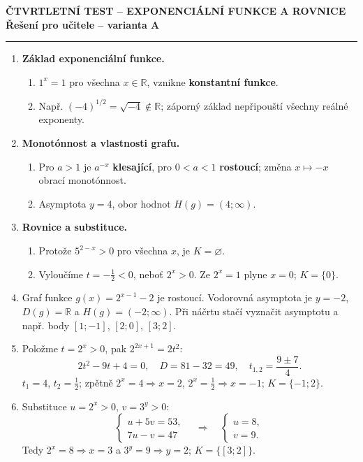 \documentclass[a4paper,11pt]{article}
\newcommand{\Title}[1]{%
\begin{center}{\large\bfseries ČTVRTLETNÍ TEST -- EXPONENCIÁLNÍ FUNKCE A ROVNICE}\\[1mm]
{\bfseries Řešení pro učitele -- varianta #1}\end{center}\hrule\vspace{3mm}}
\begin{document}
\Title{A}
\begin{enumerate}
\item \textbf{Základ exponenciální funkce.}
\begin{enumerate}[label=\alph*),leftmargin=6mm,itemsep=0.4mm,topsep=0.4mm]
\item $1^x=1$ pro všechna $x\in\mathbb R$, vznikne \textbf{konstantní funkce}.
\item Např. $(-4)^{1/2}=\sqrt{-4}\notin\mathbb R$; záporný základ nepřipouští všechny reálné exponenty.
\end{enumerate}
\item \textbf{Monotónnost a vlastnosti grafu.}
\begin{enumerate}[label=\alph*),leftmargin=6mm,itemsep=0.4mm,topsep=0.4mm]
\item Pro $a>1$ je $a^{-x}$ \textbf{klesající}, pro $0<a<1$ \textbf{rostoucí}; změna $x\mapsto -x$ obrací monotónnost.
\item Asymptota $\boxed{y=4}$, obor hodnot $\boxed{H(g)=(4;\infty)}$.
\end{enumerate}
\item \textbf{Rovnice a substituce.}
\begin{enumerate}[label=\alph*),leftmargin=6mm,itemsep=0.4mm,topsep=0.4mm]
\item Protože $5^{2-x}>0$ pro všechna $x$, je $\boxed{K=\varnothing}$.
\item Vyloučíme $t=-\frac12<0$, neboť $2^x>0$. Ze $2^x=1$ plyne $x=0$; $\boxed{K=\{0\}}$.
\end{enumerate}

\item Graf funkce $g(x)=2^{x-1}-2$ je rostoucí. Vodorovná asymptota je $\boxed{y=-2}$,
$\boxed{D(g)=\mathbb R}$ a $\boxed{H(g)=(-2;\infty)}$. Při náčrtu stačí vyznačit
asymptotu a např. body $[1;-1]$, $[2;0]$, $[3;2]$.
\item Položme $t=2^x>0$, pak $2^{2x+1}=2t^2$:
\[2t^2-9t+4=0,\quad D=81-32=49,\quad t_{1,2}=\frac{9\pm7}{4}.\]
$t_1=4$, $t_2=\frac12$; zpětně $2^x=4\Rightarrow x=2$,
$2^x=\frac12\Rightarrow x=-1$; $\boxed{K=\{-1;2\}}$.
\item Substituce $u=2^x>0$, $v=3^y>0$:
\[\begin{cases}u+5v=53,\\7u-v=47\end{cases}\quad\Longrightarrow\quad
\begin{cases}u=8,\\v=9.\end{cases}\]
Tedy $2^x=8\Rightarrow x=3$ a $3^y=9\Rightarrow y=2$;
$\boxed{K=\{[3;2]\}}$.
\end{enumerate}
\end{document}
